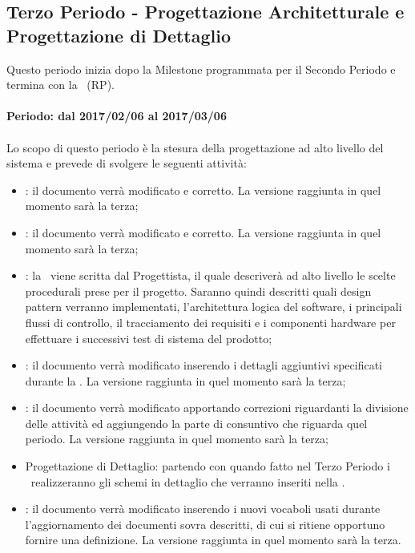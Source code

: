 \documentclass[../PianoDiProgetto_v4.0.0.tex]{subfiles}
\begin{document}
	\subsection{Terzo Periodo - Progettazione Architetturale e Progettazione di Dettaglio}
	Questo periodo inizia dopo la Milestone programmata per il Secondo Periodo e termina con la \revisionediprogettazione\ (RP).
	\\
	\\
	\textbf{Periodo: dal 2017/02/06 al 2017/03/06}
	\\
	\\
	Lo scopo di questo periodo è la stesura della progettazione ad alto livello del sistema e prevede di svolgere le seguenti attività:
	\begin{itemize}
		\item \normediprogetto: il documento verrà modificato e corretto. La versione raggiunta in quel momento sarà la terza;
		\item \analisideirequisiti: il documento verrà modificato e corretto. La versione raggiunta in quel momento sarà la terza;
		\item {}: la \ viene scritta dal Progettista, il quale descriverà ad alto livello le scelte procedurali prese per il progetto. Saranno quindi descritti quali design pattern verranno implementati, l'architettura logica del software, i principali flussi di controllo, il tracciamento dei requisiti e i componenti hardware per effettuare i successivi test di sistema del prodotto;
		\item \pianodiqualifica: il documento verrà modificato inserendo i dettagli aggiuntivi specificati durante la \revisionedeirequisiti. La versione raggiunta in quel momento sarà la terza;
		\item \pianodiprogetto: il documento verrà modificato apportando correzioni riguardanti la divisione delle attività ed aggiungendo la parte di consuntivo che riguarda quel periodo. La versione raggiunta in quel momento sarà la terza;
		\item Progettazione di Dettaglio: partendo con quando fatto nel Terzo Periodo i \progettisti\ realizzeranno gli schemi in dettaglio che verranno inseriti nella \specificatecnica.
		\item \glossario: il documento verrà modificato inserendo i nuovi vocaboli usati durante l'aggiornamento dei documenti sovra descritti, di cui si ritiene opportuno fornire una definizione. La versione raggiunta in quel momento sarà la terza.
	\end{itemize}
\end{document}
